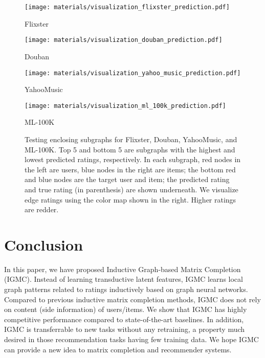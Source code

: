 \documentclass{article} \usepackage{iclr2020_conference,times}
\begin{document}
\begin{figure}[htbp]
\centering
\begin{minipage}{0.495\textwidth}
  \texttt{[image: materials/visualization\_flixster\_prediction.pdf]}
  \vspace{-17pt}
  {\footnotesize\center Flixster\par}
  \end{minipage}
  \smallskip
\begin{minipage}{0.495\textwidth}
  \texttt{[image: materials/visualization\_douban\_prediction.pdf]}
  \vspace{-17pt}
  {\footnotesize\center Douban\par}
  \end{minipage}
\begin{minipage}{0.495\textwidth}
  \texttt{[image: materials/visualization\_yahoo\_music\_prediction.pdf]}
  \vspace{-17pt}
  {\footnotesize\center YahooMusic\par}
  \end{minipage}
    \smallskip
\begin{minipage}{0.495\textwidth}
  \texttt{[image: materials/visualization\_ml\_100k\_prediction.pdf]}
  \vspace{-17pt}
  {\footnotesize\center ML-100K\par}
  \end{minipage}
  \caption{Testing enclosing subgraphs for Flixster, Douban, YahooMusic, and ML-100K. Top 5 and bottom 5 are subgraphs with the highest and lowest predicted ratings, respectively. In each subgraph, red nodes in the left are users, blue nodes in the right are items; the bottom red and blue nodes are the target user and item; the predicted rating and true rating (in parenthesis) are shown underneath. We visualize edge ratings using the color map shown in the right. Higher ratings are redder.}
  \label{vis1}
\end{figure}


















\section{Conclusion}
In this paper, we have proposed Inductive Graph-based Matrix Completion (IGMC). Instead of learning transductive latent features, IGMC learns local graph patterns related to ratings inductively based on graph neural networks. Compared to previous inductive matrix completion methods, IGMC does not rely on content (side information) of users/items. We show that IGMC has highly competitive performance compared to state-of-the-art baselines. In addition, IGMC is transferrable to new tasks without any retraining, a property much desired in those recommendation tasks having few training data. We hope IGMC can provide a new idea to matrix completion and recommender systems.
\end{document}
